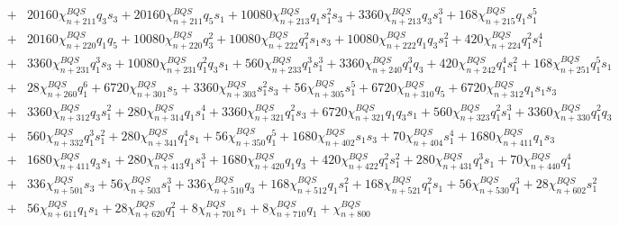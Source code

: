 \documentclass[pdflatex,prd,twocolumn,showpacs,superscriptaddress,nofootinbib]{revtex4-1}
\begin{document}
\begin{widetext}
\begin{eqnarray}
&+& 20160 \chi^{BQS}_{n+211} q_{3} s_{3} + 20160 \chi^{BQS}_{n+211} q_{5} s_{1} 
+ 10080 \chi^{BQS}_{n+213} q_{1} s_{1}^{2} s_{3} + 3360 \chi^{BQS}_{n+213} q_{3} s_{1}^{3} + 168 \chi^{BQS}_{n+215} q_{1} s_{1}^{5} \nonumber \\
&+& 20160 \chi^{BQS}_{n+220} q_{1} q_{5} + 10080 \chi^{BQS}_{n+220} q_{3}^{2} + 10080 \chi^{BQS}_{n+222} q_{1}^{2} s_{1} s_{3} 
+ 10080 \chi^{BQS}_{n+222} q_{1} q_{3} s_{1}^{2} + 420 \chi^{BQS}_{n+224} q_{1}^{2} s_{1}^{4} \nonumber \\
&+& 3360 \chi^{BQS}_{n+231} q_{1}^{3} s_{3}
 + 10080 \chi^{BQS}_{n+231} q_{1}^{2} q_{3} s_{1} + 560 \chi^{BQS}_{n+233} q_{1}^{3} s_{1}^{3} + 3360 \chi^{BQS}_{n+240} q_{1}^{3} q_{3}
 + 420 \chi^{BQS}_{n+242} q_{1}^{4} s_{1}^{2} + 168 \chi^{BQS}_{n+251} q_{1}^{5} s_{1} \nonumber \\
 &+& 28 \chi^{BQS}_{n+260} q_{1}^{6}
 + 6720 \chi^{BQS}_{n+301} s_{5} + 3360 \chi^{BQS}_{n+303} s_{1}^{2} s_{3} + 56 \chi^{BQS}_{n+305} s_{1}^{5}
 + 6720 \chi^{BQS}_{n+310} q_{5} + 6720 \chi^{BQS}_{n+312} q_{1} s_{1} s_{3} \nonumber \\
 &+& 3360 \chi^{BQS}_{n+312} q_{3} s_{1}^{2} 
 + 280 \chi^{BQS}_{n+314} q_{1} s_{1}^{4} + 3360 \chi^{BQS}_{n+321} q_{1}^{2} s_{3} + 6720 \chi^{BQS}_{n+321} q_{1} q_{3} s_{1} 
 + 560 \chi^{BQS}_{n+323} q_{1}^{2} s_{1}^{3} + 3360 \chi^{BQS}_{n+330} q_{1}^{2} q_{3} \nonumber \\
 &+& 560 \chi^{BQS}_{n+332} q_{1}^{3} s_{1}^{2} 
 + 280 \chi^{BQS}_{n+341} q_{1}^{4} s_{1} + 56 \chi^{BQS}_{n+350} q_{1}^{5} + 1680 \chi^{BQS}_{n+402} s_{1} s_{3} 
 + 70 \chi^{BQS}_{n+404} s_{1}^{4} + 1680 \chi^{BQS}_{n+411} q_{1} s_{3} \nonumber \\
 &+& 1680 \chi^{BQS}_{n+411} q_{3} s_{1} 
 + 280 \chi^{BQS}_{n+413} q_{1} s_{1}^{3} + 1680 \chi^{BQS}_{n+420} q_{1} q_{3} + 420 \chi^{BQS}_{n+422} q_{1}^{2} s_{1}^{2}
 + 280 \chi^{BQS}_{n+431} q_{1}^{3} s_{1} + 70 \chi^{BQS}_{n+440} q_{1}^{4} \nonumber \\
 &+& 336 \chi^{BQS}_{n+501} s_{3} + 56 \chi^{BQS}_{n+503} s_{1}^{3} 
 + 336 \chi^{BQS}_{n+510} q_{3} + 168 \chi^{BQS}_{n+512} q_{1} s_{1}^{2} + 168 \chi^{BQS}_{n+521} q_{1}^{2} s_{1} 
 + 56 \chi^{BQS}_{n+530} q_{1}^{3} + 28 \chi^{BQS}_{n+602} s_{1}^{2}  \nonumber \\
 &+& 56 \chi^{BQS}_{n+611} q_{1} s_{1} 
 + 28 \chi^{BQS}_{n+620} q_{1}^{2} + 8 \chi^{BQS}_{n+701} s_{1} + 8 \chi^{BQS}_{n+710} q_{1} + \chi^{BQS}_{n+800} \nonumber \\
\end{eqnarray}

\end{widetext}
\end{document}
